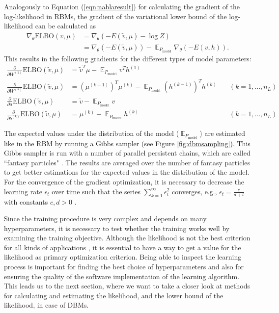 \documentclass[12pt]{article}
\newcommand{\ELBO}{\mathrm{ELBO}}
\DeclareMathOperator{\EX}{\mathbb{E}}
\begin{document}
Analogously to Equation (\ref{eqn:nablaresult}) for calculating the gradient of the log-likelihood in RBMs, the gradient of the variational lower bound of the log-likelihood can be calculated as
\begin{align*}
\nabla_{\theta} \ELBO(v, \mu) &= \nabla_{\theta} ( - E(\tilde{v}, \mu) - \log Z ) \\
 &= \nabla_{\theta} (- E(\tilde{v}, \mu)) - \EX_{P_\text{model}} \nabla_{\theta} (-E(v, h)).
\end{align*}
This results in the following gradients for the different types of model parameters:
\begin{align*}
\frac{\partial}{\partial W^{(1)}} \ELBO(\tilde{v}, \mu) &= \tilde{v}^T \mu - \EX_{P_\text{model}} v^T h^{(1)} \\
\frac{\partial}{\partial W^{(k)}} \ELBO(\tilde{v}, \mu) &= (\mu^{(k-1)})^T \mu^{(k)}  - \EX_{P_\text{model}} (h^{(k-1)})^T h^{(k)} &\quad(k = 1, \dots, n_L)\\
\frac{\partial}{\partial a}  \ELBO(\tilde{v}, \mu) &=  \tilde{v} - \EX_{P_\text{model}}  v \\
\frac{\partial}{\partial b^{(k)}}  \ELBO(\tilde{v}, \mu) &=  \mu^{(k)} - \EX_{P_\text{model}} h^{(k)}  &\quad ( k = 1, \dots, n_L)
\end{align*}

The expected values under the distribution of the model ($\EX_{P_\text{model}}$) are estimated like in the RBM by running a Gibbs sampler (see Figure \ref{fig:dbmsampling}).
This Gibbs sampler is run with a number of parallel persistent chains, which are called ``fantasy particles" \citep{salakhutdinov2009DBMs}. The results are averaged over the number of fantasy particles to get better estimations for the expected values in the distribution of the model.
For the convergence of the gradient optimization, it is necessary to decrease the learning rate $\epsilon_t$ over time such that the series $\sum_{k=1}^\infty \epsilon_t^2$ converges, e.g., $\epsilon_t = \frac{c}{d+t}$ with constants $c, d > 0$ \citep{sala2012anefficient}.

Since the training procedure is very complex and depends on many hyperparameters, it is necessary to test whether the training works well by examining the training objective.
Although the likelihood is not the best criterion for all kinds of applications \citep{theis_note_2015}, it is essential to have a way to get a value for the likelihood as primary optimization criterion.
Being able to inspect the learning process is important for finding the best choice of hyperparameters and also for ensuring the quality of the software implementation of the learning algorithm.
This leads us to the next section, where we want to take a closer look at methods for calculating and estimating the likelihood, and the lower bound of the likelihood, in case of DBMs.
\end{document}
